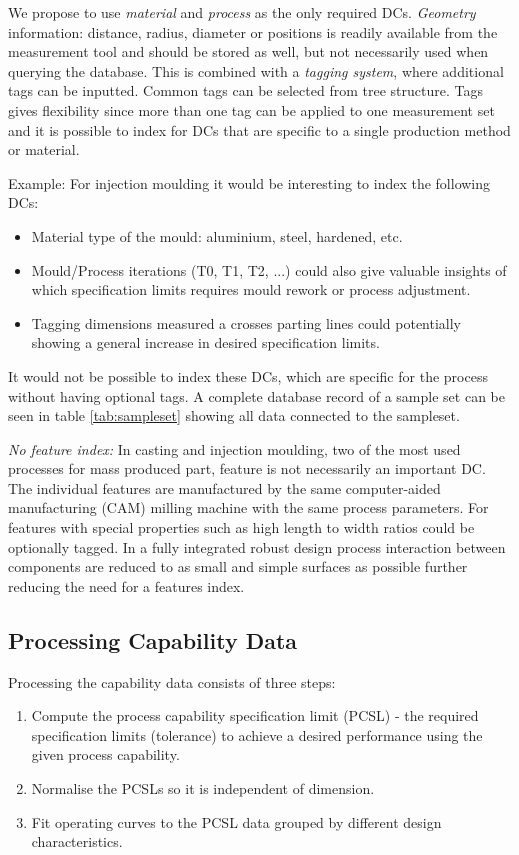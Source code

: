 \documentclass[aip,amsmath, reprint, author-year]{revtex4-1}
\begin{document}
We propose to use \emph{material} and \emph{process} as the only required DCs. 
\emph{Geometry} information: distance, radius, diameter or positions is readily available from the measurement tool and should be stored as well, but not necessarily used when querying the database.
This is combined with a \emph{tagging system}, where additional tags can be inputted. 
Common tags can be selected from tree structure. 
Tags gives flexibility since more than one tag can be applied to one measurement set and it is possible to index for DCs that are specific to a single production method or material. 

Example: For injection moulding it would be interesting to index the following DCs:
\begin{itemize}
\item Material type of the mould: aluminium, steel, hardened, etc.
\item Mould/Process iterations (T0, T1, T2, ...) could also give valuable insights of which specification limits requires mould rework or process adjustment. 
\item Tagging dimensions measured a crosses parting lines could potentially showing a general increase in desired specification limits.
\end{itemize}
It would not be possible to index these DCs, which are specific for the process without having optional tags. 
A complete database record of a sample set can be seen in table \ref{tab:sampleset} showing all data connected to the sampleset. 

\emph{No feature index:}
In casting and injection moulding, two of the most used processes for mass produced part, feature is not necessarily an important DC. 
The individual features are manufactured by the same computer-aided manufacturing (CAM) milling machine with the same process parameters. 
For features with special properties such as high length to width ratios could be optionally tagged. 
In a fully integrated robust design process interaction between components are reduced to as small and simple surfaces as possible further reducing the need for a features index.

\subsection{Processing Capability Data}

Processing the capability data consists of three steps: 

\begin{enumerate}
	\item Compute the process capability specification limit (PCSL) - the required specification limits (tolerance) to achieve a desired performance using the given process capability.
	\item Normalise the PCSLs so it is independent of dimension.
	\item Fit operating curves to the PCSL data grouped by different design characteristics.
\end{enumerate}
\end{document}
